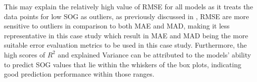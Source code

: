 This may explain the relatively high value of RMSE for all models as it treats the data points for low SOG as outliers, as previously discussed in , RMSE are more sensitive to outliers in comparison to both MAE and MAD, making it less representative in this case study which result in MAE and MAD being the more suitable error evaluation metrics to be used in this case study. Furthermore, the high scores of $R^2$ and explained Variance can be attributed to the models' ability to predict SOG values that lie within the whiskers of the box plots, indicating good prediction performance within those ranges.\\







